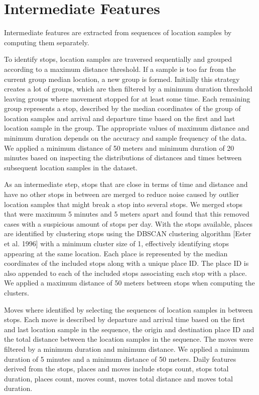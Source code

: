 \section{Intermediate Features}
Intermediate features are extracted from sequences of location samples by computing them separately. 

To identify stops, location samples are traversed sequentially and grouped according to a maximum distance threshold. If a sample is too far from the current group median location, a new group is formed. Initially this strategy creates a lot of groups, which are then filtered by a minimum duration threshold leaving groups where movement stopped for at least some time. Each remaining group represents a stop, described by the median coordinates of the group of location samples and arrival and departure time based on the first and last location sample in the group. The appropriate values of maximum distance and minimum duration depends on the accuracy and sample frequency of the data. We applied a minimum distance of 50 meters and minimum duration of 20 minutes based on inspecting the distributions of distances and times between subsequent location samples in the dataset.

As an intermediate step, stops that are close in terms of time and distance and have no other stops in between are merged to reduce noise caused by outlier location samples that might break a stop into several stops. We merged stops that were maximum 5 minutes and 5 meters apart and found that this removed cases with a suspicious amount of stops per day. With the stops available, places are identified by clustering stops using the DBSCAN clustering algorithm [Ester et al. 1996] with a minimum cluster size of 1, effectively identifying stops appearing at the same location. Each place is represented by the median coordinates of the included stops along with a unique place ID. The place ID is also appended to each of the included stops associating each stop with a place. We applied a maximum distance of 50 meters between stops when computing the clusters.

Moves where identified by selecting the sequences of location samples in between stops. Each move is described by departure and arrival time based on the first and last location sample in the sequence, the origin and destination place ID and the total distance between the location samples in the sequence. The moves were filtered by a minimum duration and minimum distance. We applied a minimum duration of 5 minutes and a minimum distance of 50 meters. Daily features derived from the stops, places and moves include stops count, stops total duration, places count, moves count, moves total distance and moves total duration.

